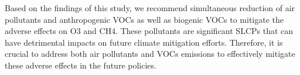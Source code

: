 Based on the findings of this study, we recommend simultaneous reduction of air pollutants and anthropogenic VOCs as well as biogenic VOCs to mitigate the adverse effects on O3 and CH4. These pollutants are significant SLCPs that can have detrimental impacts on future climate mitigation efforts. Therefore, it is crucial to address both air pollutants and VOCs emissions to effectively mitigate these adverse effects in the future policies. \par
